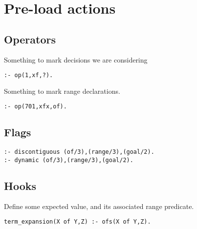 \section{Pre-load actions
}
\subsection{Operators
}
Something to mark decisions we are considering
\begin{Verbatim}
:- op(1,xf,?).
\end{Verbatim}
Something to mark range declarations.
\begin{Verbatim}
:- op(701,xfx,of).
\end{Verbatim}
\subsection{Flags
}
\begin{Verbatim}
:- discontiguous (of/3),(range/3),(goal/2).
:- dynamic (of/3),(range/3),(goal/2).
\end{Verbatim}
\subsection{Hooks
}
Define some expected value, and its associated
range predicate.
\begin{Verbatim}
term_expansion(X of Y,Z) :- ofs(X of Y,Z).
\end{Verbatim}
